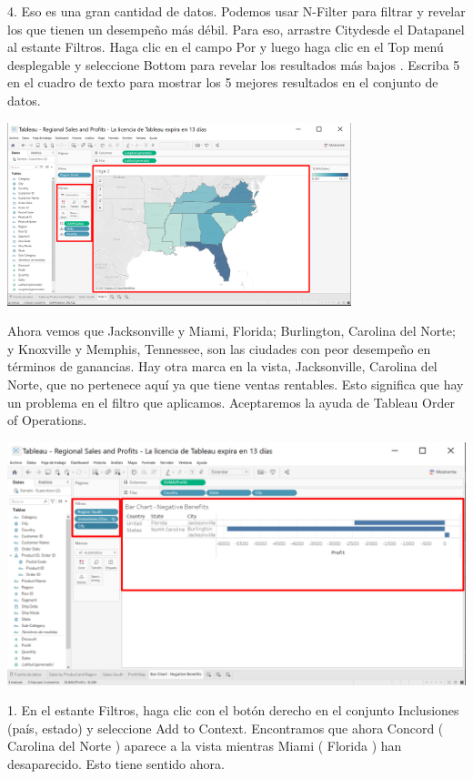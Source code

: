 \documentclass[12pt,letterpaper]{article}
\begin{document}
4. Eso es una gran cantidad de datos. Podemos usar N-Filter para filtrar y revelar los que tienen
un desempeño más débil. Para eso, arrastre Citydesde el Datapanel al estante Filtros. Haga
clic en el campo Por y luego haga clic en el Top menú desplegable y seleccione Bottom para
revelar los resultados más bajos . Escriba 5 en el cuadro de texto para mostrar los 5 mejores
resultados en el conjunto de datos.
\begin{center}
    \includegraphics[width=10cm]{img/23.png}  
\end{center}
Ahora vemos que Jacksonville y Miami, Florida; Burlington, Carolina del Norte; y Knoxville y
Memphis, Tennessee, son las ciudades con peor desempeño en términos de ganancias. Hay otra
marca en la vista, Jacksonville, Carolina del Norte, que no pertenece aquí ya que tiene ventas 
rentables. Esto significa que hay un problema en el filtro que aplicamos. Aceptaremos la ayuda
de Tableau Order of Operations.
\begin{center}
    \includegraphics[width=16cm]{img/34.png}  
\end{center}
1. En el estante Filtros, haga clic con el botón derecho en el conjunto Inclusiones (país, estado) y
seleccione Add to Context. Encontramos que ahora Concord ( Carolina del Norte )
aparece a la vista mientras Miami ( Florida ) han desaparecido. Esto tiene sentido ahora.
\end{document}
